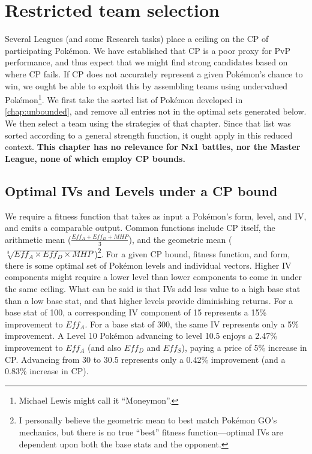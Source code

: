 \chapter{Restricted team selection\label{chap:bounded}}
Several Leagues (and some Research tasks) place a ceiling on the CP of
 participating Pokémon.
We have established that CP is a poor proxy for PvP performance, and thus
 expect that we might find strong candidates based on where CP fails.
If CP does not accurately represent a given Pokémon's chance to win, we ought
 be able to exploit this by assembling teams using undervalued Pokémon\footnote{Michael Lewis might call it ``Moneymon''.}.
We first take the sorted list of Pokémon developed in \autoref{chap:unbounded},
 and remove all entries not in the optimal sets generated below.
We then select a team using the strategies of that chapter. Since
 that list was sorted according to a general strength function, it
 ought apply in this reduced context.
\textbf{This chapter has no relevance for Nx1 battles, nor the Master
  League, none of which employ CP bounds.}

\section{Optimal IVs and Levels under a CP bound}
We require a fitness function that takes as input a Pokémon's form, level, and IV,
  and emits a comparable output.
Common functions include CP itself, the arithmetic mean ($\frac{Eff_A +Eff_D + MHP}{3}$),
  and the geometric mean ($\sqrt[3]{Eff_A \times Eff_D \times MHP}$)\footnote{I personally believe the geometric mean to best match Pokémon GO's
  mechanics, but there is no true ``best'' fitness function---optimal IVs are
  dependent upon both the base stats and the opponent.}.
For a given CP bound, fitness function, and form, there is some optimal set of Pokémon levels
 and individual vectors.
Higher IV components might require a lower level than lower components to
 come in under the same ceiling.
What can be said is that IVs add less value to a high base stat than a low
 base stat, and that higher levels provide diminishing returns.
For a base stat of 100, a corresponding IV component of 15 represents a
 15\% improvement to $Eff_A$.
For a base stat of 300, the same IV represents only a 5\% improvement.
A Level 10 Pokémon advancing to level 10.5 enjoys a 2.47\% improvement to
 $Eff_A$ (and also $Eff_D$ and $Eff_S$), paying a price of 5\% increase
 in CP.
Advancing from 30 to 30.5 represents only a 0.42\% improvement (and a
 0.83\% increase in CP).

